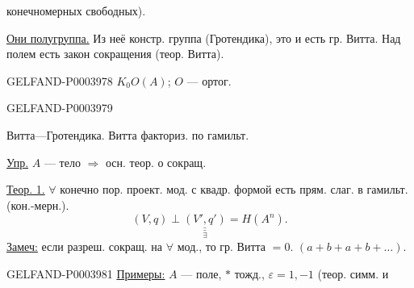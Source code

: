 конечномерных свободных).

\underline{Они полугруппа.} Из неё констр. группа (Гротендика),
это и есть гр. Витта.
Над полем есть закон сокращения (теор. Витта).

\begin{GelfandAdjacentEvidence}{GELFAND-P000397}{8}
$K_0O(A)$; $O$ — ортог.
\end{GelfandAdjacentEvidence}
\begin{GelfandAdjacentEvidence}{GELFAND-P000397}{9}

Витта—Гротендика.
Витта факториз. по гамильт.
\end{GelfandAdjacentEvidence}


\begin{flushright}\underline{Упр.} $A$ — тело $\Rightarrow$ осн. теор. о сокращ.\end{flushright}

\underline{Теор. 1.} $\forall$ конечно пор. проект. мод. с квадр. формой
есть прям. слаг. в гамильт. (кон.-мерн.).
\begin{equation*}
(V,q)\perp\underset{\exists}{\underline{\underline{(V',q')}}}=H(A^n).
\end{equation*}
\underline{Замеч:} если разреш. сокращ. на $\forall$ мод., то гр. Витта $=0$.
$(a+b+a+b+\ldots)$.


\begin{GelfandAdjacentEvidence}{GELFAND-P000398}{1}
\underline{Примеры:}  $A$ — поле, $*$ тожд., $\varepsilon=1,-1$
(теор. симм. и
\end{GelfandAdjacentEvidence}

